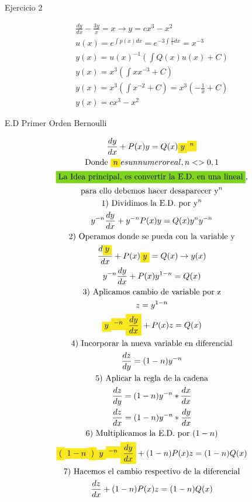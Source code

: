 \documentclass{article}
\begin{document}
Ejercicio 2


\begin{gather*}
\frac{dy}{dx}-\frac{3y}{x} = x   \rightarrow  y=cx^{3}-x^{2} \\
u(x) = e^{\int p(x)dx} = e^{-3\int \frac{1}{x}dx}= x^{-3} \\
y(x) = u(x)^{-1}(\int Q(x)u(x)+C) \\
y(x) = x^{3}(\int xx^{-3}+C) \\
y(x) = x^{3}(\int x^{-2}+C) = x^{3}(-\frac{1}{x}+C) \\
y(x) = cx^{3}-x^{2}
\end{gather*}




E.D Primer Orden Bernoulli


\begin{gather*}
\frac{dy}{dx} +P(x)y = Q(x)\text{\colorbox[RGB]{248,231,28}{$y$}}\text{\colorbox[RGB]{248,231,28}{$^{n}$}} \\
\text{Donde }\text{\colorbox[RGB]{248,231,28}{$n$}} es un numero real, n <> 0,1 \\
\text{\colorbox[RGB]{126,211,33}{$\text{La Idea principal, es convertir la E.D. en una lineal}$}}, \\
\text{para ello debemos hacer desaparecer y}^{n} \\
1)\text{ Dividimos la E.D. por y}^{n} \\
y^{-n}\frac{dy}{dx} +y^{-n}P(x)y = Q(x)y^{n}y^{-n} \\
2)\text{ Operamos donde se pueda con la variable y} \\
\frac{d\text{\colorbox[RGB]{248,231,28}{$y$}}}{dx} +P(x)\text{\colorbox[RGB]{248,231,28}{$y$}} = Q(x)   \rightarrow  y(x) \\
y^{-n}\frac{dy}{dx} +P(x)y^{1-n} = Q(x) \\
3)\text{ Aplicamos cambio de variable por z} \\
z = y^{1-n} \\
\text{\colorbox[RGB]{248,231,28}{$y$}}\text{\colorbox[RGB]{248,231,28}{$^{-n}$}}\text{\colorbox[RGB]{248,231,28}{$\frac{dy}{dx}$}} +P(x)z = Q(x) \\
4)\text{ Incorporar la nueva variable en diferencial} \\
\frac{dz}{dy} =(1-n)y^{-n}  \\
5)\text{ Aplicar la regla de la cadena} \\
\frac{dz}{dy} =(1-n)y^{-n}*\frac{dx}{dx} \\
\frac{dz}{dx} =(1-n)y^{-n}*\frac{dy}{dx} \\
6)\text{ Multiplicamos la E.D. por }(1-n) \\
\text{\colorbox[RGB]{248,231,28}{$($}}\text{\colorbox[RGB]{248,231,28}{$1-n$}}\text{\colorbox[RGB]{248,231,28}{$)$}}\text{\colorbox[RGB]{248,231,28}{$y$}}\text{\colorbox[RGB]{248,231,28}{$^{-n}$}}\text{\colorbox[RGB]{248,231,28}{$\frac{dy}{dx}$}} +(1-n)P(x)z =(1-n)Q(x) \\
7)\text{ Hacemos el cambio respectivo de la diferencial} \\
\frac{dz}{dx}+(1-n)P(x)z =(1-n)Q(x)
\end{gather*}
\end{document}
